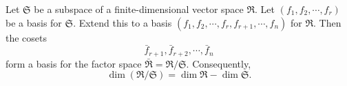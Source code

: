 Let $\mathfrak{S}$ be a subspace of a finite-dimensional vector space $\mathfrak{R}$. Let $(f_1, f_2, \cdots, f_r)$ be a basis for $\mathfrak{S}$. Extend this to a basis $(f_1, f_2, \cdots, f_r, f_{r+1}, \cdots, f_n)$ for $\mathfrak{R}$. Then the cosets
$$
\bar{f}_{r+1}, \bar{f}_{r+2}, \cdots, \bar{f}_n
$$
form a basis for the factor space $\bar{\mathfrak{R}} = \mathfrak{R} / \mathfrak{S}$. Consequently,
$$
\dim(\mathfrak{R} / \mathfrak{S}) = \dim \mathfrak{R} - \dim \mathfrak{S}.
$$
